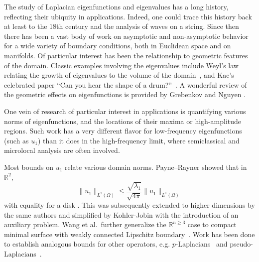 \documentclass{amsart}
\theoremstyle{plain}
\begin{document}
The study of Laplacian eigenfunctions and eigenvalues has a long history, reflecting their ubiquity in applications. Indeed, one could trace this history back at least to the 18th century and the analysis of waves on a string. Since then there has been a vast body of work on asymptotic and non-asymptotic behavior for a wide variety of boundary conditions, both in Euclidean space and on manifolds. Of particular interest has been the relationship to geometric features of the domain. Classic examples involving the eigenvalues include Weyl's law relating the growth of eigenvalues to the volume of the domain~\cite{Weyl1911}, and Kac's celebrated paper ``Can you hear the shape of a drum?''~\cite{kac1966can}.
A wonderful review of the geometric effects on eigenfunctions is provided by Grebenkov and Nguyen \cite{grebenkov2013geometrical}.

One vein of research of particular interest in applications is quantifying
various norms of eigenfunctions, and the locations of their maxima
or high-amplitude regions.  %
Such work has a very different flavor for low-frequency eigenfunctions (such as $u_1$)
than it does in the high-frequency limit, where semiclassical and microlocal analysis are often involved.  %

Most bounds on $u_1$ relate various domain norms.
Payne--Rayner showed that in $\mathbb{R}^2$,
$$\|u_1\|_{L^2(\Omega)} \le \frac{\sqrt{\lambda_1}}{\sqrt{4 \pi}}\|u_1\|_{L^1(\Omega)}$$
with equality for a disk \cite{payne1972isoperimetric}. This was subsequently extended to higher dimensions by the same authors \cite{payne1973some} and simplified by Kohler-Jobin \cite{kohler1977premiere} with the introduction of an auxiliary problem. 
Wang et al.\ further generalize the $\mathbb{R}^{n\geq 3}$ case to compact minimal surface with weakly connected Lipschitz boundary~\cite{wang2010isoperimetric}.
Work has been done to establish analogous bounds for other operators, e.g. $p$-Laplacians~\cite{alvino1998properties} and pseudo-Laplacians~\cite{mossino1983generalization}.
\end{document}
